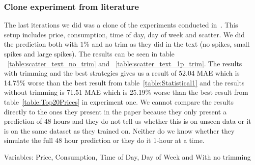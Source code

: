 \subsubsection{Clone experiment from literature}
The last iterations we did was a clone of the experiments conducted in~\cite{singhal2011electricity}. This setup includes price, consumption, time of day, day of week and scatter. We did the prediction both with 1\% and no trim as they did in the text (no spikes, small spikes and large spikes). The results can be seen in table ~\ref{table:scatter_text_no_trim} and ~\ref{table:scatter_text_1p_trim}. The results with trimming and the best strategies gives us a result of 52.04 MAE which is 14.75\% worse than the best result from table~\ref{table:Statistical1} and the results without trimming is 71.51 MAE which is 25.19\% worse than the best result from table~\ref{table:Top20Prices} in experiment one. We cannot compare the results directly to the ones they present in the paper because they only present a prediction of 48 hours and they do not tell us whether this is on unseen data or it is on the same dataset as they trained on. Neither do we know whether they simulate the full 48 hour prediction or they do it 1-hour at a time.

Variables: Price, Consumption, Time of Day, Day of Week and With no trimming
\begin{table}[H]
\centering  %
\caption{Scatter text~\cite{singhal2011electricity} with other calculated inputs and no trim} %
\label{table:scatter_text_no_trim} %
\end{table}

